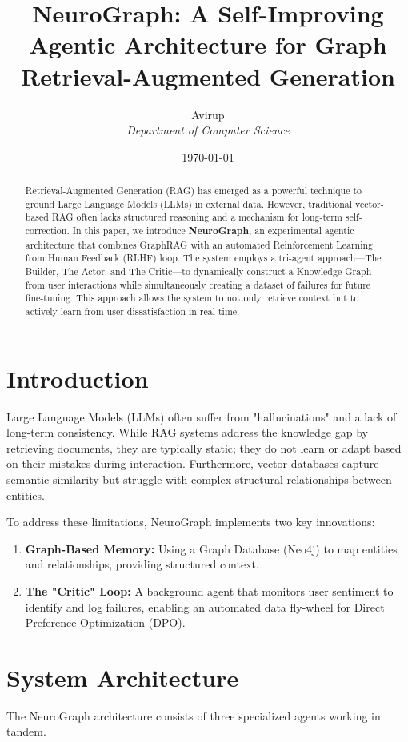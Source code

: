\documentclass[a4paper,12pt]{article}
\title{\textbf{NeuroGraph: A Self-Improving Agentic Architecture for Graph Retrieval-Augmented Generation}}
\author{Avirup \\ \textit{Department of Computer Science}}
\date{\today}
\begin{document}
\maketitle

\begin{abstract}
Retrieval-Augmented Generation (RAG) has emerged as a powerful technique to ground Large Language Models (LLMs) in external data. However, traditional vector-based RAG often lacks structured reasoning and a mechanism for long-term self-correction. In this paper, we introduce \textbf{NeuroGraph}, an experimental agentic architecture that combines GraphRAG with an automated Reinforcement Learning from Human Feedback (RLHF) loop. The system employs a tri-agent approach---The Builder, The Actor, and The Critic---to dynamically construct a Knowledge Graph from user interactions while simultaneously creating a dataset of failures for future fine-tuning. This approach allows the system to not only retrieve context but to actively learn from user dissatisfaction in real-time.
\end{abstract}

\section{Introduction}
Large Language Models (LLMs) often suffer from "hallucinations" and a lack of long-term consistency. While RAG systems address the knowledge gap by retrieving documents, they are typically static; they do not learn or adapt based on their mistakes during interaction. Furthermore, vector databases capture semantic similarity but struggle with complex structural relationships between entities.

To address these limitations, NeuroGraph implements two key innovations:
\begin{enumerate}
    \item \textbf{Graph-Based Memory:} Using a Graph Database (Neo4j) to map entities and relationships, providing structured context.
    \item \textbf{The "Critic" Loop:} A background agent that monitors user sentiment to identify and log failures, enabling an automated data fly-wheel for Direct Preference Optimization (DPO).
\end{enumerate}

\section{System Architecture}
The NeuroGraph architecture consists of three specialized agents working in tandem.
\end{document}
